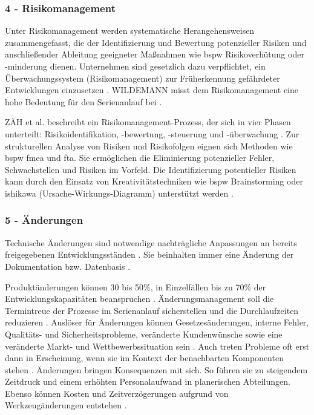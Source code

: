 \subsubsection*{4 - Risikomanagement}
Unter Risikomanagement werden systematische Herangehensweisen zusammengefasst, die der Identifizierung und Bewertung potenzieller Risiken und anschließender Ableitung geeigneter Maßnahmen wie \gls{bspw} Risikoverhütung oder -minderung dienen. %
Unternehmen sind gesetzlich dazu verpflichtet, ein Überwachungssystem (Risikomanagement) zur Früherkennung gefährdeter Entwicklungen einzusetzen \autocite[302]{Burghardt2006}.
WILDEMANN misst dem Risikomanagement eine hohe Bedeutung für den Serienanlauf bei \autocite{Wildemann2004}. 

ZÄH et al. beschreibt ein Risikomanagement-Prozess, der sich in vier Phasen unterteilt: Risikoidentifikation, -bewertung, -steuerung und -überwachung \autocite{Zaeh2004}. 
Zur strukturellen Analyse von Risiken und Risikofolgen eignen sich  Methoden wie \gls{bspw} \gls{fmea} und \gls{fta}. Sie ermöglichen die Eliminierung potenzieller Fehler, Schwachstellen und Risiken im Vorfeld.
Die Identifizierung potentieller Risiken kann durch den Einsatz von Kreativitätstechniken wie \gls{bspw} Brainstorming oder \gls{ishikawa} (Ursache-Wirkungs-Diagramm) unterstützt werden \autocite[41]{Bischoff2007}. 

\subsubsection*{5 - Änderungen}

Technische Änderungen sind notwendige nachträgliche Anpassungen an bereits freigegebenen Entwicklungsständen \autocite{Zanner2002}. Sie beinhalten immer eine Änderung der Dokumentation bzw. Datenbasis \autocite[47]{Niemerg1997}. 	

Produktänderungen können 30 bis 50\%, in Einzelfällen bis zu 70\% der Entwicklungskapazitäten beanspruchen \autocite[2]{Lindemann1998}.
Änderungsmanagement soll die Termintreue der Prozesse im Serienanlauf sicherstellen und die Durchlaufzeiten reduzieren \autocite[216]{Schuh2008}. 
Auslöser für Änderungen können Gesetzesänderungen, interne Fehler, Qualitäts- und Sicherheitsprobleme, veränderte Kundenwünsche sowie eine veränderte Markt- und Wettbewerbssituation sein \autocite{Zanner2002}. Auch treten Probleme oft erst dann in Erscheinung, wenn sie im Kontext der benachbarten Komponenten stehen \autocite[24]{Kuhn2002}.
Änderungen bringen Konsequenzen mit sich. So führen sie zu steigendem Zeitdruck und einem erhöhten Personalaufwand in planerischen Abteilungen. Ebenso können Kosten und Zeitverzögerungen aufgrund von Werkzeugänderungen entstehen \autocite[24]{Kuhn2002}. 

